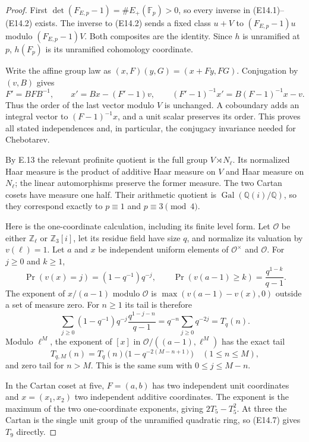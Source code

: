 \documentclass[11pt,oneside]{article}
\begin{document}
\begin{proof}
First $\det(F_{E,p}-1)=\#E_+(\mathbb F_p)>0$, so every inverse
in (E14.1)--(E14.2) exists.  The inverse to (E14.2) sends a
fixed class $u+V$ to $(F_{E,p}-1)u$ modulo $(F_{E,p}-1)V$.
Both composites are the identity.  Since $h$ is unramified at
$p$, $h(F_p)$ is its unramified cohomology coordinate.

Write the affine group law as
$(x,F)(y,G)=(x+Fy,FG)$.
Conjugation by $(v,B)$ gives
\[
 F'=BFB^{-1},\qquad x'=Bx-(F'-1)v,\qquad
 (F'-1)^{-1}x'=B(F-1)^{-1}x-v.
 \tag{E14.6}
\]
Thus the order of the last vector modulo $V$ is unchanged.
A coboundary adds an integral vector to $(F-1)^{-1}x$, and
a unit scalar preserves its order.  This proves all stated
independences and, in particular, the conjugacy invariance
needed for Chebotarev.

By E.13 the relevant profinite quotient is the full group
$V\rtimes N_\ell$.  Its normalized Haar measure is the product
of additive Haar measure on $V$ and Haar measure on $N_\ell$;
the linear automorphisms preserve the former measure.
The two Cartan cosets have measure one half.  Their arithmetic
quotient is $\operatorname{Gal}(\mathbb Q(i)/\mathbb Q)$, so they
correspond exactly to $p\equiv1$ and $p\equiv3\pmod4$.

Here is the one-coordinate calculation, including its finite
level form.  Let $\mathcal O$ be either $\mathbb Z_\ell$ or
$\mathbb Z_3[i]$, let its residue field have size $q$, and
normalize its valuation by $v(\ell)=1$.  Let $a$ and $x$ be
independent uniform elements of $\mathcal O^\times$ and
$\mathcal O$.  For $j\ge0$ and $k\ge1$,
\[
 \Pr(v(x)=j)=(1-q^{-1})q^{-j},\qquad
 \Pr(v(a-1)\ge k)=\frac{q^{1-k}}{q-1}.
\]
The exponent of $x/(a-1)$ modulo $\mathcal O$ is
$\max(v(a-1)-v(x),0)$ outside a set of measure zero.
For $n\ge1$ its tail is therefore
\[
 \sum_{j\ge0}(1-q^{-1})q^{-j}
          \frac{q^{1-j-n}}{q-1}
   =q^{-n}\sum_{j\ge0}q^{-2j}
   =T_q(n).
 \tag{E14.7}
\]
Modulo $\ell^M$, the exponent of $[x]$ in
$\mathcal O/((a-1),\ell^M)$ has the exact tail
\[
 T_{q,M}(n)=T_q(n)\bigl(1-q^{-2(M-n+1)}\bigr)
       \quad(1\le n\le M),
 \tag{E14.8}
\]
and zero tail for $n>M$.  This is the same sum with
$0\le j\le M-n$.

In the Cartan coset at five, $F=(a,b)$ has two independent
unit coordinates and $x=(x_1,x_2)$ two independent additive
coordinates.  The exponent is the maximum of the two
one-coordinate exponents, giving $2T_5-T_5^2$.
At three the Cartan is the single unit group of the unramified
quadratic ring, so (E14.7) gives $T_9$ directly.


\end{proof}
\end{document}
